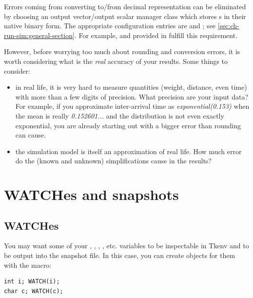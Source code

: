 Errors coming from converting to/from decimal representation can be
eliminated by choosing an output vector/output scalar manager class
which stores s in their native binary form.
The appropriate configuration entries are 
and ; see \ref{sec:ch-run-sim:general-section}.
For example,  and 
provided in  fulfill this requirement.

However, before worrying too much about rounding and conversion errors,
it is worth considering what is the \textit{real} accuracy of your results.
Some things to consider:

\begin{itemize}
  \item{in real life, it is very hard to measure quantities (weight, distance,
     even time) with more than a few digits of precision. What precision
     are your input data? For example, if you approximate inter-arrival
     time as \textit{exponential(0.153)} when the mean is really
     \textit{0.152601...} and the distribution is not even exactly exponential,
     you are already starting out with a bigger error than rounding can cause.}

  \item{the simulation model is itself an approximation of real life. How much
     error do the (known and unknown) simplifications cause in the results?}
\end{itemize}




\section{WATCHes and snapshots}

\subsection{WATCHes}

You may want some of your , , , , etc. variables to
be inspectable in Tkenv and to be output into the snapshot
file. In this case, you can create
 objects for them with the  macro:

\begin{verbatim}
int i; WATCH(i);
char c; WATCH(c);
\end{verbatim}

